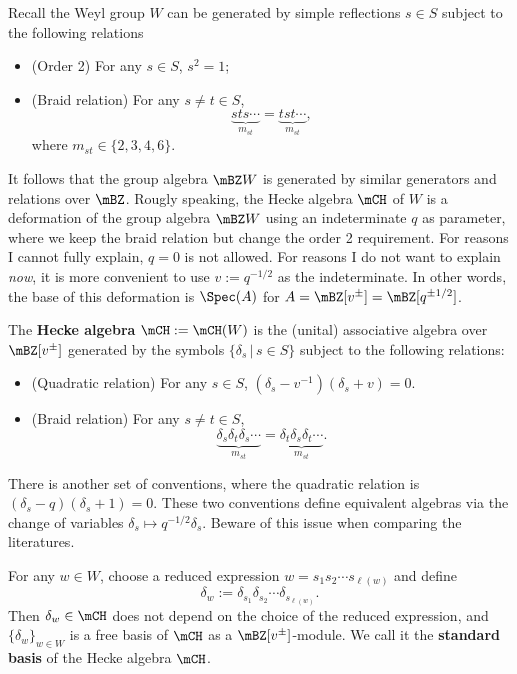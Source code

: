 	Recall the Weyl group $W$ can be generated by simple reflections $s\in S$ subject to the following relations
	\begin{itemize}
		\item (Order 2)
			For any $s\in S$, $s^2 =1$;
		\item (Braid relation)
			For any $s\neq t\in S$, 
			\[
				\underset{m_{st}}{\underbrace{sts\cdots}}=\underset{m_{st}}{\underbrace{tst\cdots}},
			\]
			where $m_{st}\in \{2,3,4,6\}$.
	\end{itemize}
	It follows that the group algebra $\mBZ W$ is generated by similar generators and relations over $\mBZ$. Rougly speaking, the Hecke algebra $\mCH$ of $W$ is a deformation of the group algebra $\mBZ W$ using an indeterminate $q$ as parameter, where we keep the braid relation but change the order 2 requirement. For reasons I cannot fully explain, $q=0$ is not allowed. For reasons I do not want to explain \emph{now}, it is more convenient to use $v:=q^{-1/2}$ as the indeterminate. In other words, the base of this deformation is $\Spec(A)$ for $A=\mBZ[v^{\pm}]=\mBZ[q^{\pm 1/2}]$.

\begin{defn}
	The \textbf{Hecke algebra} $\mCH:=\mCH(W)$ is the (unital) associative algebra over $\mBZ[v^{\pm}]$ generated by the symbols $\{\delta_s \,\vert\, s\in S\}$ subject to the following relations:
	\begin{itemize}
		\item (Quadratic relation)
			For any $s\in S$, $(\delta_s - v^{-1})(\delta_s + v) = 0.$	
		\item (Braid relation)
			For any $s\neq t\in S$, 
			\[
				\underset{m_{st}}{\underbrace{\delta_s\delta_t\delta_s\cdots}}=\underset{m_{st}}{\underbrace{\delta_t\delta_s\delta_t\cdots}}.
			\]
	\end{itemize}
\end{defn}

\begin{warn}
	There is another set of conventions, where the quadratic relation is $(\delta_s-q)(\delta_s+1) = 0$. These two conventions define equivalent algebras via the change of variables $\delta_s \mapsto q^{-1/2}\delta_s$. Beware of this issue when comparing the literatures.
\end{warn}

\begin{propdefn}	
	For any $w\in W$, choose a reduced expression $w= s_1s_2\cdots s_{\ell(w)}$ and define
	\[
		\delta_w := \delta_{s_1}\delta_{s_2}\cdots \delta_{s_{\ell(w)}}.
	\]
	Then $\delta_w\in \mCH$ does not depend on the choice of the reduced expression, and $\{\delta_w\}_{w\in W}$ is a free basis of $\mCH$ as a $\mBZ[v^\pm]$-module. We call it the \textbf{standard basis} of the Hecke algebra $\mCH$.

\end{propdefn}


